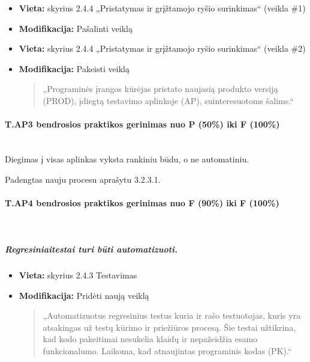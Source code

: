 \documentclass{article}
\newcommand{\subsubsubsection}[1]{\paragraph{#1}\mbox{}\\}
\begin{document}
\begin{itemize}
    \item \textbf{Vieta:} skyrius 2.4.4 „Pristatymas ir grįžtamojo ryšio surinkimas“ (veikla \#1)
    \item \textbf{Modifikacija:} Pašalinti veiklą
\end{itemize}
\vspace{20pt}
\begin{itemize}
    \item \textbf{Vieta:} skyrius 2.4.4 „Pristatymas ir grįžtamojo ryšio surinkimas“ (veikla \#2)
    \item \textbf{Modifikacija:} Pakeisti veiklą
    \begin{quote}
        „Programinės įrangos kūrėjas pristato naujasią produkto versiją (PROD), įdiegtą testavimo aplinkoje (AP), suinteresuotoms šalims.“
    \end{quote}
\end{itemize}

\subsubsubsection{T.AP3 bendrosios praktikos gerinimas nuo P (50\%) iki F (100\%)}

Diegimas į visas aplinkas vyksta rankiniu būdu, o ne automatiniu.

Padengtas nauju procesu aprašytu 3.2.3.1.

\subsubsubsection{T.AP4 bendrosios praktikos gerinimas nuo F (90\%) iki F (100\%)} 

\subparagraph{Regresiniaitestai turi būti automatizuoti.}
\begin{itemize}
    \item \textbf{Vieta:} skyrius 2.4.3 Testavimas
    \item \textbf{Modifikacija:} Pridėti naują veiklą
    \begin{quote}
    „Automatizuotus regresinius testus kuria ir rašo testuotojas, kuris yra atsakingas už testų kūrimo ir priežiūros procesą. Šie testai užtikrina, kad kodo pakeitimai nesukelia klaidų ir nepažeidžia esamo funkcionalumo. Laikoma, kad atnaujintas programinis kodas (PK).“
    \end{quote}
\end{itemize}



\newpage
\end{document}
